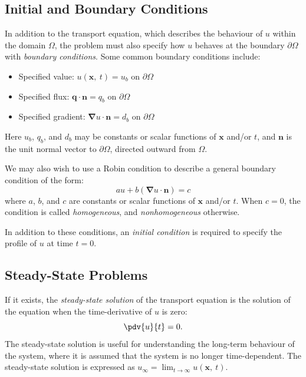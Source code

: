 \documentclass{article}
\begin{document}
\subsection{Initial and Boundary Conditions}
In addition to the transport equation, which describes the behaviour of
\(u\) within the domain \(\Omega\), the problem must also specify how
\(u\) behaves at the boundary \(\partial \Omega\) with \textit{boundary
conditions}. Some common boundary conditions include:
\begin{itemize}
    \item Specified value: \(u\left( \symbf{x},\: t \right) = u_b\) on
          \(\partial \Omega\)
    \item Specified flux: \(\symbf{q} \cdot \symbf{n} = q_b\) on
          \(\partial \Omega\)
    \item Specified gradient: \(\symbf{\nabla} u \cdot \symbf{n} =
          d_b\) on \(\partial \Omega\)
\end{itemize}
Here \(u_b\), \(q_b\), and \(d_b\) may be constants or scalar functions
of \(\symbf{x}\) and/or \(t\), and \(\symbf{n}\) is the unit normal vector
to \(\partial \Omega\), directed outward from \(\Omega\).

We may also wish to use a Robin condition to describe a general
boundary condition of the form:
\begin{equation*}
    a u + b \left( \symbf{\nabla} u \cdot \symbf{n} \right) = c
\end{equation*}
where \(a\), \(b\), and \(c\) are constants or scalar functions of
\(\symbf{x}\) and/or \(t\). When \(c = 0\), the condition is called
\textit{homogeneous}, and \textit{nonhomogeneous} otherwise.

In addition to these conditions, an \textit{initial condition} is
required to specify the profile of \(u\) at time \(t = 0\).
\subsection{Steady-State Problems}
If it exists, the \textit{steady-state solution} of the transport
equation is the solution of the equation when the time-derivative of
\(u\) is zero:
\begin{equation*}
    \pdv{u}{t} = 0.
\end{equation*}
The steady-state solution is useful for understanding the long-term
behaviour of the system, where it is assumed that the system is no longer
time-dependent. The steady-state solution is expressed as
\(u_\infty = \lim_{t \to \infty} u\left( \symbf{x},\: t \right)\).
\end{document}
